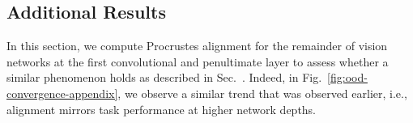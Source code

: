 \documentclass[10pt,letterpaper]{article}
\begin{document}
\subsection{Additional Results}
In this section, we compute Procrustes alignment for the remainder of vision networks at the first convolutional and penultimate layer to assess whether a similar phenomenon holds as described in Sec.~. Indeed, in Fig.~\ref{fig:ood-convergence-appendix}, we observe a similar trend that was observed earlier, i.e., alignment mirrors task performance at higher network depths. 


\end{document}
